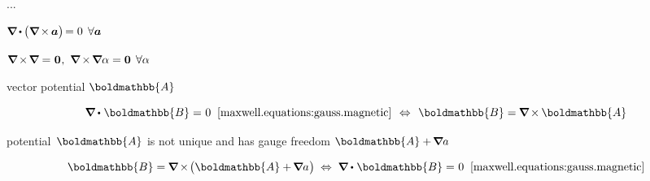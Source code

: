 ...


${\boldnabla \hspace{-0.1ex} \dotp \hspace{-0.1ex} \bigl( \boldnabla \hspace{-0.2ex} \times \hspace{-0.16ex} \bm{a} \bigr) \hspace{-0.3ex} = 0 \:\:\forall \bm{a}}$

${
\boldnabla \hspace{-0.2ex} \times \hspace{-0.28ex} \boldnabla = \hspace{.08ex} \bm{0}
\hspace{.1ex} , \hspace{.33em}
\boldnabla \hspace{-0.15ex} \times \hspace{-0.25ex} \boldnabla \alpha = \bm{0} \:\:\forall \alpha
}$

vector potential $\boldmathbb{A}$

\nopagebreak\[
\boldnabla \dotp \hspace{.12ex} \boldmathbb{B} = \hspace{.1ex} 0
\;\;\eqref{maxwell.equations:gauss.magnetic}
\hspace{.4em} \Leftrightarrow \hspace{.4em}
\boldmathbb{B} =  \hspace{-0.1ex} \boldnabla \hspace{-0.15ex} \times \hspace{-0.12ex} \boldmathbb{A}
\]

potential~${\boldmathbb{A}}$ is not unique and has gauge freedom ${\boldmathbb{A} + \hspace{-0.2ex} \boldnabla a}$

\[
\boldmathbb{B} =  \hspace{-0.1ex} \boldnabla \hspace{-0.15ex} \times \hspace{-0.3ex} \bigl( \boldmathbb{A} + \hspace{-0.2ex} \boldnabla a \hspace{.1ex} \bigr)
\hspace{.25em} \Leftrightarrow \hspace{.27em}
\boldnabla \dotp \hspace{.12ex} \boldmathbb{B} = \hspace{.1ex} 0
\;\;\eqref{maxwell.equations:gauss.magnetic}
\]


